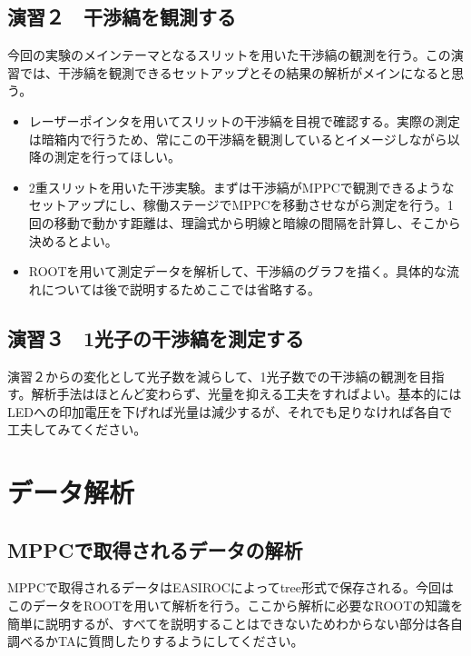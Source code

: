 \documentclass[uplatex,10pt,a4j]{jsarticle}
\begin{document}
\subsection{演習２　干渉縞を観測する}
今回の実験のメインテーマとなるスリットを用いた干渉縞の観測を行う。この演習では、干渉縞を観測できるセットアップとその結果の解析がメインになると思う。
\begin{itemize}
  \item レーザーポインタを用いてスリットの干渉縞を目視で確認する。実際の測定は暗箱内で行うため、常にこの干渉縞を観測しているとイメージしながら以降の測定を行ってほしい。
  \item 2重スリットを用いた干渉実験。まずは干渉縞がMPPCで観測できるようなセットアップにし、稼働ステージでMPPCを移動させながら測定を行う。1回の移動で動かす距離は、理論式から明線と暗線の間隔を計算し、そこから決めるとよい。
  \item ROOTを用いて測定データを解析して、干渉縞のグラフを描く。具体的な流れについては後で説明するためここでは省略する。
\end{itemize}

\subsection{演習３　1光子の干渉縞を測定する}
演習２からの変化として光子数を減らして、1光子数での干渉縞の観測を目指す。解析手法はほとんど変わらず、光量を抑える工夫をすればよい。基本的にはLEDへの印加電圧を下げれば光量は減少するが、それでも足りなければ各自で工夫してみてください。

\clearpage






\section{データ解析}
\subsection{MPPCで取得されるデータの解析}
MPPCで取得されるデータはEASIROCによってtree形式で保存される。今回はこのデータをROOTを用いて解析を行う。ここから解析に必要なROOTの知識を簡単に説明するが、すべてを説明することはできないためわからない部分は各自調べるかTAに質問したりするようにしてください。




\end{document}
